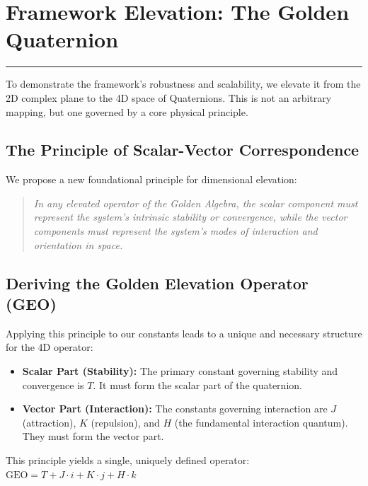 \section{Framework Elevation: The Golden Quaternion}
\label{chap:quaternion_elevation}

\hrule
\vspace{1em}
To demonstrate the framework's robustness and scalability, we elevate it from the 2D complex plane to the 4D space of Quaternions. This is not an arbitrary mapping, but one governed by a core physical principle.

\subsection*{The Principle of Scalar-Vector Correspondence}
We propose a new foundational principle for dimensional elevation:
\begin{quote}
    \textit{In any elevated operator of the Golden Algebra, the scalar component must represent the system's intrinsic stability or convergence, while the vector components must represent the system's modes of interaction and orientation in space.}
\end{quote}

\subsection*{Deriving the Golden Elevation Operator (GEO)}
Applying this principle to our constants leads to a unique and necessary structure for the 4D operator:
\begin{itemize}
    \item \textbf{Scalar Part (Stability):} The primary constant governing stability and convergence is $T$. It must form the scalar part of the quaternion.
    \item \textbf{Vector Part (Interaction):} The constants governing interaction are $J$ (attraction), $K$ (repulsion), and $H$ (the fundamental interaction quantum). They must form the vector part.
\end{itemize}
This principle yields a single, uniquely defined operator:
$ \text{GEO} = T + J\cdot i + K\cdot j + H\cdot k $

